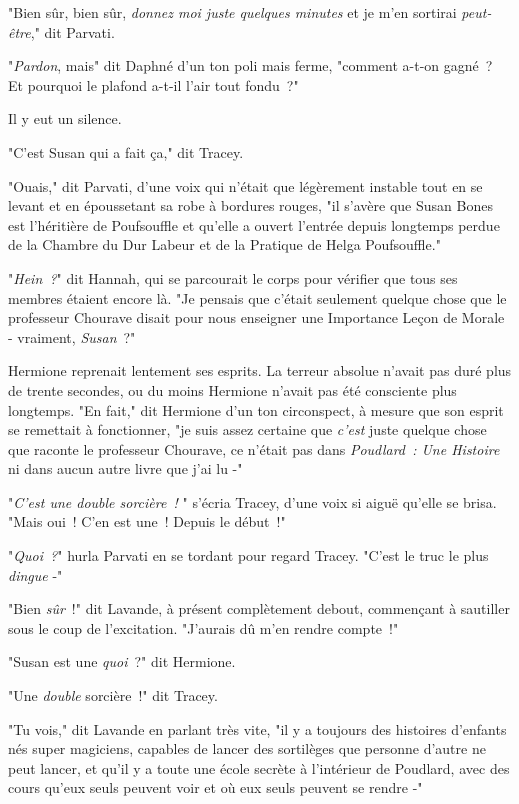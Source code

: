 "Bien sûr, bien sûr, \emph{donnez moi juste quelques minutes} et je m'en sortirai \emph{peut-être}," dit Parvati.

"\emph{Pardon}, mais" dit Daphné d'un ton poli mais ferme, "comment a-t-on gagné~? Et pourquoi le plafond a-t-il l'air tout fondu~?"

Il y eut un silence.

"C'est Susan qui a fait ça," dit Tracey.

"Ouais," dit Parvati, d'une voix qui n'était que légèrement instable tout en se levant et en époussetant sa robe à bordures rouges, "il s'avère que Susan Bones est l'héritière de Poufsouffle et qu'elle a ouvert l'entrée depuis longtemps perdue de la Chambre du Dur Labeur et de la Pratique de Helga Poufsouffle."

"\emph{Hein~?}" dit Hannah, qui se parcourait le corps pour vérifier que tous ses membres étaient encore là. "Je pensais que c'était seulement quelque chose que le professeur Chourave disait pour nous enseigner une Importance Leçon de Morale - vraiment, \emph{Susan}~?"

Hermione reprenait lentement ses esprits. La terreur absolue n'avait pas duré plus de trente secondes, ou du moins Hermione n'avait pas été consciente plus longtemps. "En fait," dit Hermione d'un ton circonspect, à mesure que son esprit se remettait à fonctionner, "je suis assez certaine que \emph{c'est} juste quelque chose que raconte le professeur Chourave, ce n'était pas dans \emph{Poudlard~: Une Histoire} ni dans aucun autre livre que j'ai lu -"

"\emph{C'est une double sorcière~!} " s'écria Tracey, d'une voix si aiguë qu'elle se brisa. "Mais oui~! C'en est une~! Depuis le début~!"

"\emph{Quoi~?}" hurla Parvati en se tordant pour regard Tracey. "C'est le truc le plus \emph{dingue} -"

"Bien \emph{sûr}~!" dit Lavande, à présent complètement debout, commençant à sautiller sous le coup de l'excitation. "J'aurais dû m'en rendre compte~!"

"Susan est une \emph{quoi}~?" dit Hermione.

"Une \emph{double} sorcière~!" dit Tracey.

"Tu vois," dit Lavande en parlant très vite, "il y a toujours des histoires d'enfants nés super magiciens, capables de lancer des sortilèges que personne d'autre ne peut lancer, et qu'il y a toute une école secrète à l'intérieur de Poudlard, avec des cours qu'eux seuls peuvent voir et où eux seuls peuvent se rendre -"

